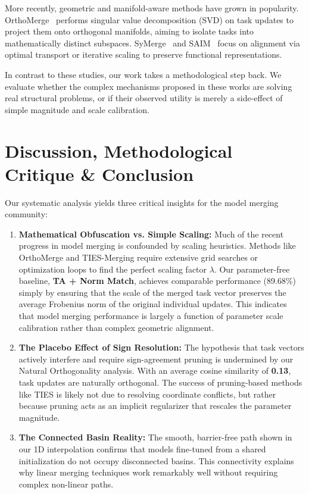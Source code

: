 \documentclass{article}
\begin{document}
More recently, geometric and manifold-aware methods have grown in popularity. OrthoMerge~\cite{orthomerge2024} performs singular value decomposition (SVD) on task updates to project them onto orthogonal manifolds, aiming to isolate tasks into mathematically distinct subspaces. SyMerge~\cite{symerge2023} and SAIM~\cite{saim2024} focus on alignment via optimal transport or iterative scaling to preserve functional representations. 

In contrast to these studies, our work takes a methodological step back. We evaluate whether the complex mechanisms proposed in these works are solving real structural problems, or if their observed utility is merely a side-effect of simple magnitude and scale calibration.

\section{Discussion, Methodological Critique \& Conclusion}
\label{sec:conclusion}

Our systematic analysis yields three critical insights for the model merging community:

\begin{enumerate}
    \item \textbf{Mathematical Obfuscation vs. Simple Scaling:} Much of the recent progress in model merging is confounded by scaling heuristics. Methods like OrthoMerge and TIES-Merging require extensive grid searches or optimization loops to find the perfect scaling factor $\lambda$. Our parameter-free baseline, \textbf{TA + Norm Match}, achieves comparable performance (89.68\%) simply by ensuring that the scale of the merged task vector preserves the average Frobenius norm of the original individual updates. This indicates that model merging performance is largely a function of parameter scale calibration rather than complex geometric alignment.
    \item \textbf{The Placebo Effect of Sign Resolution:} The hypothesis that task vectors actively interfere and require sign-agreement pruning is undermined by our Natural Orthogonality analysis. With an average cosine similarity of \textbf{0.13}, task updates are naturally orthogonal. The success of pruning-based methods like TIES is likely not due to resolving coordinate conflicts, but rather because pruning acts as an implicit regularizer that rescales the parameter magnitude.
    \item \textbf{The Connected Basin Reality:} The smooth, barrier-free path shown in our 1D interpolation confirms that models fine-tuned from a shared initialization do not occupy disconnected basins. This connectivity explains why linear merging techniques work remarkably well without requiring complex non-linear paths.
\end{enumerate}
\end{document}
